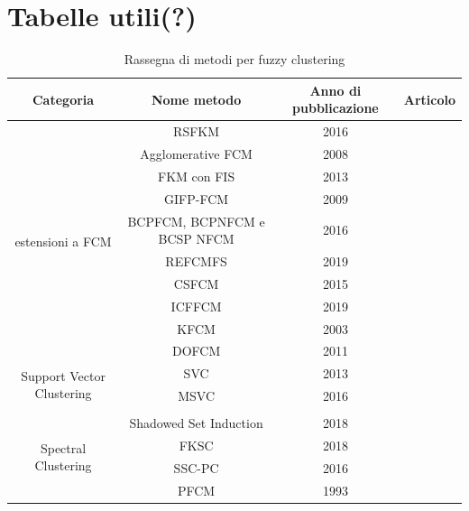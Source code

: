 \documentclass{article}
\begin{document}
	\section{Tabelle utili(?)}
		\begin{table}[h!]
			\caption{Rassegna di metodi per fuzzy clustering}
			\begin{center}\begin{tabular}{ |c|c|c|c| } 
					\hline
					Categoria & Nome metodo & Anno di pubblicazione & Articolo\\
					\hline
					\multirow{10}{4em}{estensioni a FCM} & RSFKM & 2016 & \cite{bib:rsfkm}\\ 
														& Agglomerative FCM & 2008 & \cite{bib:afkm}\\
														& FKM con FIS & 2013 & \cite{bib:fkmfis}\\ 
														& GIFP-FCM & 2009 & \cite{bib:gifpfcm}\\
														& BCPFCM, BCPNFCM e BCSP NFCM & 2016 & \cite{bib:bcpfcm}\\
														& REFCMFS & 2019 & \cite{bib:refcmfs}\\ 
														& CSFCM & 2015 & \cite{bib:csfcm}\\
														& ICFFCM & 2019 &\cite{bib:icffcm}\\
														& KFCM & 2003 &\cite{bib:kfcm}\\
														& DOFCM & 2011 & \cite{bib:dofcm}\\
					\hline													
					\multirow{2}{4em}{Support Vector Clustering}	& SVC & 2013 & \cite{bib:svc}\\ 
																	& MSVC & 2016 & \cite{bib:msvc}\\ 
																	&  &  & \\
					\hline
					& Shadowed Set Induction & 2018 & \cite{bib:ssi} \\
					\hline
					\multirow{2}{4em}{Spectral Clustering}	& FKSC & 2018 & \cite{bib:fksc}\\ 
															& SSC-PC & 2016 & \cite{bib:sscpc}\\ 
					\hline
					& PFCM & 1993 & \cite{bib:pfcm}\\
					\hline
			\end{tabular}
		\end{center}
		\label{tab:clustering}	
	\end{table}		
\end{document}
